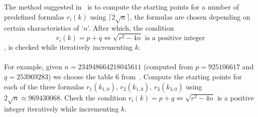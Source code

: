 \documentclass{article}
\begin{document}
{%
The method suggested in~\cite{Mohammed2017} is to compute the starting points for a number of predefined formulas $r_i(k)$ using $\lceil 2\sqrt{n} \rceil$, the formulas are chosen depending on certain characteristics of `$n$'. After which, the condition 
\begin{equation}\label{eq:condition}
r_i(k) = p+q \iff \sqrt{r^2-4n} \text{ is a positive integer}
\end{equation}
, is checked while iteratively incrementing $k$.\\ 
~\\
%
%
% 
%
For example, given $n=234948664218045611$ (computed from $p=925106617$ and $q=253969283$) we choose the table 6 from~\cite{Mohammed2017}. Compute the starting points for each of the three formulas $r_1(k_{1,0})$, $r_2(k_{1,0})$, $r_3(k_{3,0})$ using $2\sqrt{n} \approx 969430068$. Check the  condition $r_i(k) = p+q \iff \sqrt{r^2-4n}$ is a positive integer iteratively while incrementing $k$. \\
}
\end{document}
